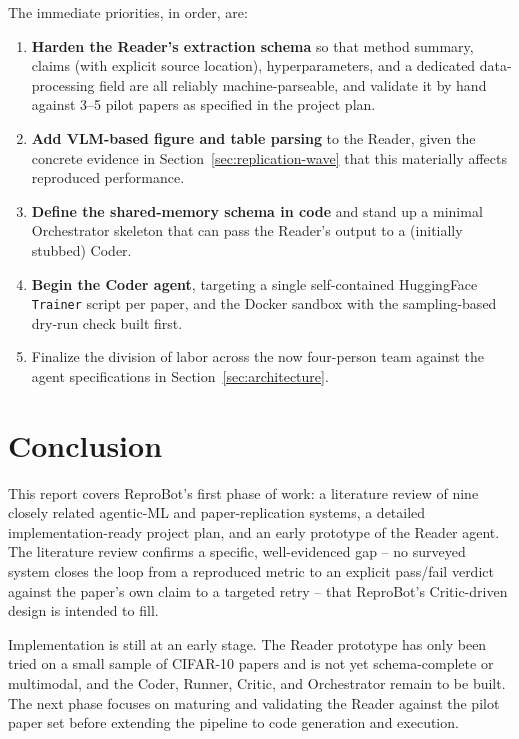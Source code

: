 \documentclass[10pt,twocolumn]{article}
\begin{document}
The immediate priorities, in order, are:
\begin{enumerate}
  \item \textbf{Harden the Reader's extraction schema} so that method summary, claims
  (with explicit source location), hyperparameters, and a dedicated data-processing
  field are all reliably machine-parseable, and validate it by hand against 3--5 pilot
  papers as specified in the project plan.
  \item \textbf{Add VLM-based figure and table parsing} to the Reader, given the
  concrete evidence in Section~\ref{sec:replication-wave} that this materially affects
  reproduced performance.
  \item \textbf{Define the shared-memory schema in code} and stand up a minimal
  Orchestrator skeleton that can pass the Reader's output to a (initially stubbed)
  Coder.
  \item \textbf{Begin the Coder agent}, targeting a single self-contained HuggingFace
  \texttt{Trainer} script per paper, and the Docker sandbox with the sampling-based
  dry-run check built first.
  \item Finalize the division of labor across the now four-person team against the
  agent specifications in Section~\ref{sec:architecture}.
\end{enumerate}

\section{Conclusion}
\label{sec:conclusion}

This report covers ReproBot's first phase of work: a literature review of nine closely
related agentic-ML and paper-replication systems, a detailed implementation-ready
project plan, and an early prototype of the Reader agent. The literature review confirms
a specific, well-evidenced gap -- no surveyed system closes the loop from a reproduced
metric to an explicit pass/fail verdict against the paper's own claim to a targeted
retry -- that ReproBot's Critic-driven design is intended to fill.

Implementation is still at an early stage. The Reader prototype has only been tried on a
small sample of CIFAR-10 papers and is not yet schema-complete or multimodal, and the
Coder, Runner, Critic, and Orchestrator remain to be built. The next phase focuses on
maturing and validating the Reader against the pilot paper set before extending the
pipeline to code generation and execution.
\end{document}
